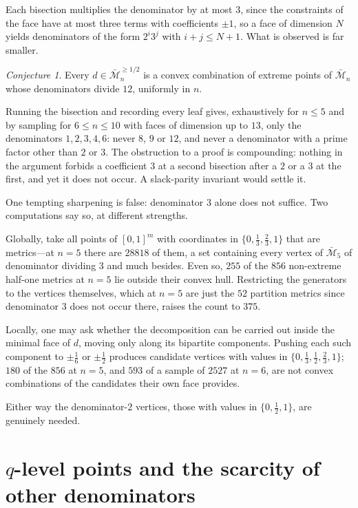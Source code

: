 \documentclass[11pt]{article}
\theoremstyle{definition}
\theoremstyle{remark}
\newtheorem{conjecture}[theorem]{Conjecture}
\newcommand{\bM}{\bar{\mathcal{M}}}
\begin{document}
Each bisection multiplies the denominator by at most $3$, since the constraints of the face
have at most three terms with coefficients $\pm1$, so a face of dimension $N$ yields
denominators of the form $2^i3^j$ with $i+j\leq N+1$. What is observed is far smaller.

\begin{conjecture}\label{conj:den12}
Every $d\in\bM_n^{\geq1/2}$ is a convex combination of extreme points of $\bM_n$ whose
denominators divide $12$, uniformly in $n$.
\end{conjecture}

Running the bisection and recording every leaf gives, exhaustively for $n\leq5$ and by
sampling for $6\leq n\leq10$ with faces of dimension up to $13$, only the denominators
$1,2,3,4,6$: never $8$, $9$ or $12$, and never a denominator with a prime factor other than
$2$ or $3$. The obstruction to a proof is compounding: nothing in the argument forbids a
coefficient $3$ at a second bisection after a $2$ or a $3$ at the first, and yet it does not
occur. A slack-parity invariant would settle it.

One tempting sharpening is false: denominator $3$ alone does not suffice. Two computations
say so, at different strengths.

Globally, take all points of $[0,1]^m$ with coordinates in $\{0,\tfrac13,\tfrac23,1\}$ that
are metrics---at $n=5$ there are $28818$ of them, a set containing every vertex of $\bM_5$
of denominator dividing $3$ and much besides. Even so, $255$ of the $856$ non-extreme
half-one metrics at $n=5$ lie outside their convex hull. Restricting the generators to the
vertices themselves, which at $n=5$ are just the $52$ partition metrics since denominator
$3$ does not occur there, raises the count to $375$.

Locally, one may ask whether the decomposition can be carried out inside the minimal face of
$d$, moving only along its bipartite components. Pushing each such component to
$\pm\tfrac16$ or $\pm\tfrac12$ produces candidate vertices with values in
$\{0,\tfrac13,\tfrac12,\tfrac23,1\}$; $180$ of the $856$ at $n=5$, and $593$ of a sample of
$2527$ at $n=6$, are not convex combinations of the candidates their own face provides.

Either way the denominator-$2$ vertices, those with values in $\{0,\tfrac12,1\}$, are
genuinely needed.

\section{$q$-level points and the scarcity of other denominators}
\label{sec:qlevel}
\end{document}
